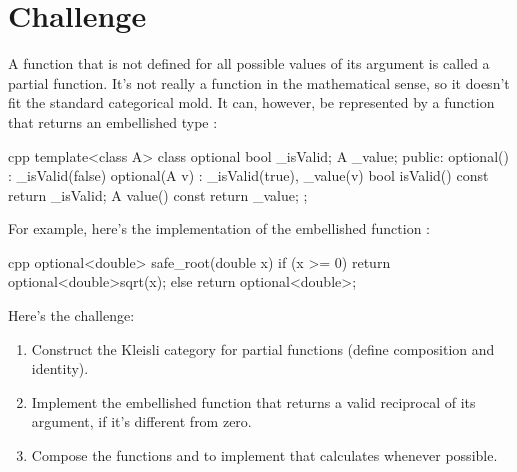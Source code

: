 \section{Challenge}

A function that is not defined for all possible values of its argument
is called a partial function. It's not really a function in the
mathematical sense, so it doesn't fit the standard categorical mold. It
can, however, be represented by a function that returns an embellished
type :

\begin{snip}{cpp}
template<class A> class optional {
    bool _isValid;
    A _value;
public:
    optional()    : _isValid(false) {}
    optional(A v) : _isValid(true), _value(v) {}
    bool isValid() const { return _isValid; }
    A value() const { return _value; }
};
\end{snip}
For example, here's the implementation of the embellished function
:

\begin{snip}{cpp}
optional<double> safe_root(double x) {
    if (x >= 0) return optional<double>{sqrt(x)};
    else return optional<double>{};
}
\end{snip}
Here's the challenge:

\begin{enumerate}
  \tightlist
  \item
        Construct the Kleisli category for partial functions (define
        composition and identity).
  \item
        Implement the embellished function  that
        returns a valid reciprocal of its argument, if it's different from
        zero.
  \item
        Compose the functions  and  to implement
         that calculates 
        whenever possible.
\end{enumerate}
